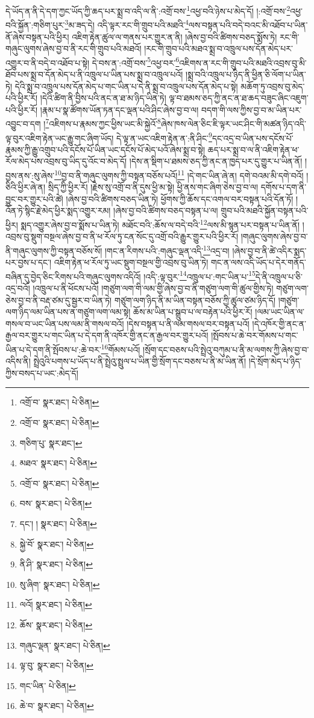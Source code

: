 དེ་ཡོད་ན་ནི་དེ་དག་ཀྱང་ཡོད་ཀྱི་ཆད་པར་སྨྲ་བ་འདི་ལ་ནི་:འགྲོ་བས་\footnote{འགྲོ་བ་  སྣར་ཐང་།  པེ་ཅིན། }འཕྱ་བའི་ཉེས་པ་མེད་དོ། །:འགྲོ་བས་\footnote{འགྲོ་བ་  སྣར་ཐང་།  པེ་ཅིན། }འཕྱ་བའི་སྐྱོན་:གཅིག་པུར་\footnote{གཅིག་པུ་  སྣར་ཐང་། }མ་ཟད་དེ། འདི་ལྟར་རང་གི་གྲུབ་པའི་མཐའི་\footnote{མཐའ་  སྣར་ཐང་།  པེ་ཅིན། }ལས་བསྟན་པའི་བདེ་བའང་མི་འཐོབ་པ་ཡིན་ནོ་ཞེས་བསྟན་པའི་ཕྱིར། འཇིག་རྟེན་ཚུལ་ལ་གནས་པར་གྱུར་ན་ནི། །ཞེས་བྱ་བའི་ཚིགས་བཅད་སྨོས་ཏེ། རང་གི་གཞུང་ལུགས་ཞེས་བྱ་བ་ནི་རང་གི་གྲུབ་པའི་མཐའོ། །རང་གི་གྲུབ་པའི་མཐའ་སྨྲ་བ་འཁྲུལ་པས་དོན་མེད་པར་འགྱུར་བ་ནི་བདེ་བ་འཐོབ་པ་སྟེ། དེ་བས་ན་:འགྲོ་བས་\footnote{འགྲོ་བ་  སྣར་ཐང་།  པེ་ཅིན། }འཕྱ་བར་\footnote{བས་  སྣར་ཐང་།  པེ་ཅིན། }འཇིགས་ན་རང་གི་གྲུབ་པའི་མཐའི་འབྲས་བུ་མི་ཐོབ་པས་སྨྲ་བ་དོན་མེད་པ་ནི་འཁྲུལ་པ་ཡིན་པས་སྨྲ་བ་འཁྲུལ་པའོ། །སྨྲ་བའི་འཁྲུལ་པ་ཉིད་ནི་ཕྱིན་ཅི་ལོག་པ་ཡིན་ཏེ། དེའི་སྨྲ་བ་འཁྲུལ་པས་དོན་མེད་པ་གང་ཡིན་པ་དེ་ནི་སྨྲ་བ་འཁྲུལ་པས་དོན་མེད་པ་སྟེ། མཆོག་ཏུ་འབྲས་བུ་མེད་པའི་ཕྱིར་རོ། །དེའི་ཚིག་ནི་བྱིས་པའི་ནང་ན་ཐ་མ་ཉིད་ཡིན་ཏེ། ལྟ་བ་ཐམས་ཅད་ཀྱི་ནང་ན་ཐ་ཆད་བཟུང་ཞིང་འཇུག་པའི་ཕྱིར་རོ། །རྣམ་པ་སྣ་ཚོགས་ཡོན་ཏན་དང་ལྡན་པའི་ཤིང་ཞེས་བྱ་བ་ལ། བདག་གི་ལས་ཀྱིས་བྱ་བ་མ་ཡིན་པར་འབྱུང་བ་དག །\footnote{དང་། །  སྣར་ཐང་།  པེ་ཅིན། }འཇིགས་པ་རྣམས་ཀྱང་ཕྱིས་ཡང་མི་སྐྱེའོ་\footnote{སྐྱེ་བོ་  སྣར་ཐང་།  པེ་ཅིན། }ཞེས་ཁས་ལེན་ཅིང་ཇི་ལྟར་ཡང་ཤིང་གི་མཚན་ཉིད་འདི་ལྟ་བུར་འཇིག་རྟེན་ཡང་རྒྱུ་གང་ཞིག་ཡོད། དེ་ལྟ་ན་ཡང་འཇིག་རྟེན་ན་:ནི་ཤིང་\footnote{ནི་ཤི་  སྣར་ཐང་།  པེ་ཅིན། }དང་འདྲ་བ་ཡིན་པས་དངོས་པོ་རྣམས་ཀྱི་རྒྱུ་འགྲུབ་པའི་དངོས་པོ་ཡིན་ཡང་དངོས་པོ་མེད་པའོ་ཞེས་སྨྲ་བ་སྟེ། ཆད་པར་སྨྲ་བ་ལ་ནི་འཇིག་རྟེན་ཕ་རོལ་མེད་པས་འབྲས་བུ་ཡིད་དུ་འོང་བ་མེད་དོ། །དེས་ན་སྡིག་པ་ཐམས་ཅད་ཀྱི་ནང་ན་ཁྱད་པར་དུ་གྱུར་པ་ཡིན་ནོ། །བྱས་ནས་:སུ་ཞེས་\footnote{སུ་ཞིག་  སྣར་ཐང་།  པེ་ཅིན། }བྱ་བ་ནི་གཞུང་ལུགས་ཀྱི་བསྟན་བཅོས་པའོ།\footnote{ལའོ།  སྣར་ཐང་།  པེ་ཅིན། } །དེ་གང་ཡིན་ཞེ་ན། དགེ་བའམ་མི་དགེ་བའོ། །ཅིའི་ཕྱིར་ཞེ་ན། སྲིད་ཀྱི་ཕྱིར་རོ། །རྗེས་སུ་འགྲོ་བ་ནི་དུས་ཕྱི་མ་སྟེ། ཕྱི་ནས་གང་ཞིག་ཅེས་བྱ་བ་ལ། དགོས་པ་དག་ནི་བྱུང་བར་གྱུར་པའི་ཚེ། །ཞེས་བྱ་བའི་ཚིགས་བཅད་ཡིན་ཏེ། ཕྱོགས་ཀྱི་ཆོས་དང་འགལ་བར་བསྟན་པའི་དོན་ཏོ། །འོན་ཏེ་སྙིང་རྗེ་མེད་ཕྱིར་སྨད་འགྱུར་རམ། །ཞེས་བྱ་བའི་ཚིགས་བཅད་བསྟན་པ་ལ། གྲུབ་པའི་མཐའི་སྐྱོན་བསྟན་པའི་ཕྱིར། སྨད་འགྱུར་ཞེས་བྱ་བ་སྨོས་པ་ཡིན་ཏེ། མཐོང་བའི་:ཆོས་ལ་བདེ་བའི་\footnote{ཆོས་  སྣར་ཐང་།  པེ་ཅིན། }ལས་མི་སྙན་པར་བསྟན་པ་ཡིན་ནོ། །འབྲས་བུ་སྡུག་བསྔལ་ཞེས་བྱ་བ་ནི་ཕ་རོལ་ཏུ་ངན་སོང་དུ་འགྲོ་བའི་རྒྱུར་གྱུར་པའི་ཕྱིར་རོ། །གཞུང་ལུགས་ཞེས་བྱ་བ་ནི་གཞུང་ལུགས་ཀྱི་བསྟན་བཅོས་སོ། །གང་ན་རིགས་པའི་:གཞུང་ལྡན་འདི་\footnote{གཞུང་ལྡན་  སྣར་ཐང་།  པེ་ཅིན། }འདྲ་བ། །ཞེས་བྱ་བ་ནི་ཚེ་འདིར་སྨད་པར་བྱས་པ་དང་། འཇིག་རྟེན་ཕ་རོལ་ཏུ་ཡང་སྡུག་བསྔལ་གྱི་འབྲས་བུ་ཡིན་ཏེ། གང་ན་ལས་འདི་ཡོད་པ་དེར་གནོད་བཞིན་དུ་བྱེད་ཅིང་རིགས་པའི་གཞུང་ལུགས་འདིའོ། །འདི་:ལྟ་བུར་\footnote{ལྟ་བུ་  སྣར་ཐང་།  པེ་ཅིན། }འཁྲུལ་པ་:གང་ཡིན་པ་\footnote{གང་ཡིན་  པེ་ཅིན། }དེ་ནི་འཁྲུལ་པ་ཅི་འདྲ་བའོ། །འཁྲུལ་པ་ནི་ཕོངས་པའོ། །གཙུག་ལག་གི་ལམ་གྱི་ཞེས་བྱ་བ་ནི་གཙུག་ལག་གི་ཚུལ་གྱིས་ཏེ། གཙུག་ལག་ཅེས་བྱ་བ་ནི་བརྡ་ཙམ་དུ་སྦྱར་བ་ཡིན་ཏེ། གཙུག་ལག་ཉིད་ནི་མ་ཡིན་བསྟན་བཅོས་ཀྱི་ཚུལ་ཙམ་ཉིད་དོ། །གཙུག་ལག་ཉིད་ལམ་ཡིན་པས་ན་གཙུག་ལག་ལམ་སྟེ། ཆོས་མ་ཡིན་པ་སྒྲུབ་པ་ལ་བརྟེན་པའི་ཕྱིར་རོ། །ལམ་ཡང་ཡིན་ལ་གསལ་བ་ཡང་ཡིན་པས་ལམ་ནི་གསལ་བའོ། །དེས་བསྟན་པ་ནི་ལམ་གསལ་བར་བསྟན་པའོ། །དེ་འཁོར་གྱི་ནང་ན་རྒྱལ་བར་གྱུར་པ་གང་ཡིན་པ་དེ་དག་ནི་འཁོར་གྱི་ནང་ན་རྒྱལ་བར་གྱུར་པའོ། །སྤོབས་པ་ཆེ་བར་གོམས་པ་གང་ཡིན་པ་དེ་དག་ནི་སྤོབས་པ་:ཆེ་བར་\footnote{ཆེ་བ་  སྣར་ཐང་།  པེ་ཅིན། }གོམས་པའོ། །སྲོག་དང་བཅས་པའི་སྤྲེའུ་བཀུམ་པ་ནི་མ་ལགས་ཀྱི་ཞེས་བྱ་བ་འདིས་ནི། སྤྲེའུའི་པགས་པ་ཡོད་པ་ནི་སྤྲེའུ་སྤྲུལ་པ་ཡིན་གྱི་སྲོག་དང་བཅས་པ་ནི་མ་ཡིན་ནོ། །དེ་སྲོག་མེད་པ་ཉིད་ཀྱིས་བསད་པ་ཡང་:མེད་དོ། 
